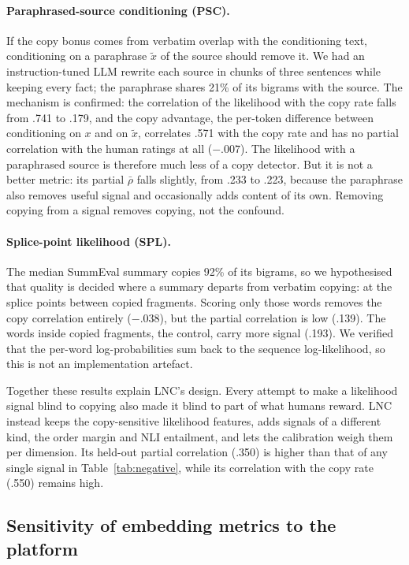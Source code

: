\paragraph{Paraphrased-source conditioning (PSC).} If the copy bonus comes from verbatim overlap with the conditioning text, conditioning on a paraphrase $\tilde x$ of the source should remove it. We had an instruction-tuned LLM rewrite each source in chunks of three sentences while keeping every fact; the paraphrase shares 21\% of its bigrams with the source. The mechanism is confirmed: the correlation of the likelihood with the copy rate falls from .741 to .179, and the copy advantage, the per-token difference between conditioning on $x$ and on $\tilde x$, correlates .571 with the copy rate and has no partial correlation with the human ratings at all ($-.007$). The likelihood with a paraphrased source is therefore much less of a copy detector. But it is not a better metric: its partial $\bar\rho$ falls slightly, from .233 to .223, because the paraphrase also removes useful signal and occasionally adds content of its own. Removing copying from a signal removes copying, not the confound.

\paragraph{Splice-point likelihood (SPL).} The median SummEval summary copies 92\% of its bigrams, so we hypothesised that quality is decided where a summary departs from verbatim copying: at the splice points between copied fragments. Scoring only those words removes the copy correlation entirely ($-.038$), but the partial correlation is low (.139). The words inside copied fragments, the control, carry more signal (.193). We verified that the per-word log-probabilities sum back to the sequence log-likelihood, so this is not an implementation artefact.

Together these results explain LNC's design. Every attempt to make a likelihood signal blind to copying also made it blind to part of what humans reward. LNC instead keeps the copy-sensitive likelihood features, adds signals of a different kind, the order margin and NLI entailment, and lets the calibration weigh them per dimension. Its held-out partial correlation (.350) is higher than that of any single signal in Table~\ref{tab:negative}, while its correlation with the copy rate (.550) remains high.

\subsection{Sensitivity of embedding metrics to the platform}

